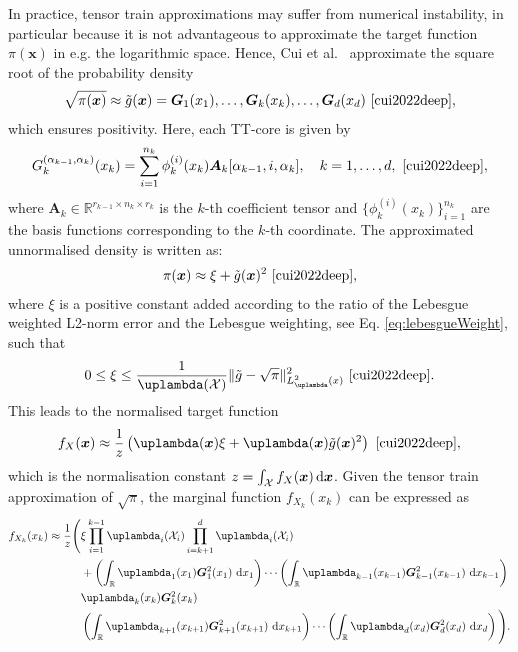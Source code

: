 In practice, tensor train approximations may suffer from numerical instability, in particular because it is not advantageous to approximate the target function $\pi(\bm{x})$ in e.g. the logarithmic space. 
Hence, Cui et al.~\cite{cui2022deep} approximate the square root of the probability density
\begin{align}
	\sqrt{\pi(\bm{x})} \approx \tilde{g}(\bm{x}) = \bm{G}_1(x_1), \dots, \bm{G}_k(x_k), \dots, \bm{G}_d(x_d)\, \,  \text{\cite[Eq. 18]{cui2022deep}},
\end{align}
which ensures positivity.
Here, each TT-core is given by
\begin{equation}
	G^{(\alpha_{k-1},\alpha_k)}_k(x_k) = \sum_{i=1}^{n_k} \phi^{(i)}_k(x_k) \bm{A}_k[\alpha_{k-1}, i, \alpha_k], \quad k = 1, \dots, d,\, \,  \text{\cite[Eq. 21]{cui2022deep}},
\end{equation}
where $\bm{A}_k \in \mathbb{R}^{r_{k-1} \times n_k \times r_k}$ is the $k$-th coefficient tensor and $\{\phi^{(i)}_k(x_k)\}_{i=1}^{n_k}$ are the basis functions corresponding to the $k$-th coordinate.
The approximated unnormalised density is written as:
\begin{align}
	\pi(\bm{x}) \approx \xi + \tilde{g}(\bm{x})^2\, \,  \text{\cite[Eq. 19]{cui2022deep}},
\end{align}
where $\xi$ is a positive constant added according to the ratio of the Lebesgue weighted L2-norm error and the Lebesgue weighting, see Eq. \ref{eq:lebesgueWeight}, such that
\begin{align}
	0 \leq \xi \leq \frac{1}{\uplambda(\mathcal{X})} \lVert \tilde{g} - \sqrt{\pi} \rVert_{L^2_{\uplambda}(x)}^2\, \,  \text{\cite[Eq. 35]{cui2022deep}}. \label{eq:gamErr}
\end{align}
This leads to the normalised target function
\begin{align}
	f_X(\bm{x})  \approx \frac{1}{z} \left( \uplambda(\bm{x}) \xi  + \uplambda(\bm{x}) \tilde{g}(\bm{x})^2 \right)\, \,  \text{\cite[Eq. 19]{cui2022deep}},
\end{align}
which is the normalisation constant $z = \int_{\mathcal{X}} f_X(\bm{x}) \mathop{}\!\mathrm{d} \bm{x} $.
Given the tensor train approximation of $\sqrt{\pi}$, the marginal function $f_{X_k}(x_k)$ can be expressed as
\begin{align}
	\begin{split}
		f_{X_k}(x_k)  \approx \frac{1}{z} \Bigg(&\xi \prod_{i=1}^{k-1} \uplambda_i(\mathcal{X}_i) \prod_{i=k+1}^{d} \uplambda_i(\mathcal{X}_i) \\
		&+ \left( \int_{\mathbb{R}} \uplambda_1(x_1) \bm{G}_1^2(x_1)  \, \diff x_1 \right) \cdots 
		\left( \int_{\mathbb{R}} \uplambda_{k-1}(x_{k-1}) \bm{G}_{k-1}^2(x_{k-1}) \, \diff x_{k-1} \right) \\
		& \uplambda_k(x_k) \bm{G}_k^2(x_k)  \\
		&\left( \int_{\mathbb{R}} \uplambda_{k+1}(x_{k+1}) \bm{G}_{k+1}^2(x_{k+1})  \,\diff x_{k+1} \right) \cdots 
		\left( \int_{\mathbb{R}} \uplambda_d(x_d) \bm{G}_d^2(x_d)  \, \diff x_d \right) \Bigg).
	\end{split}
\end{align}




